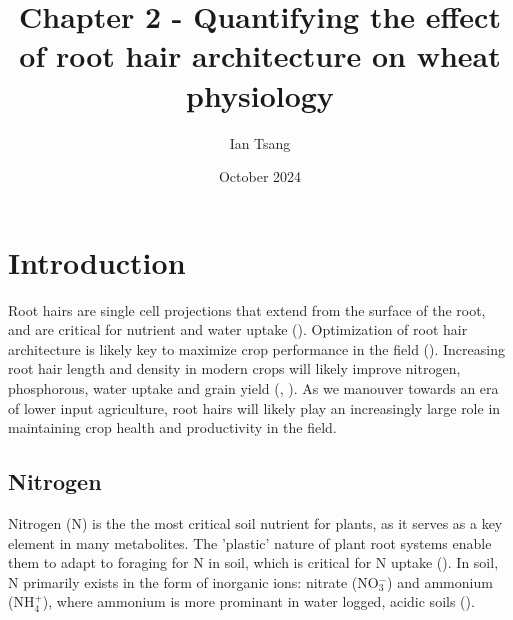 \documentclass{article}
\title{Chapter 2 - Quantifying the effect of root hair architecture on wheat
physiology}
\author{Ian Tsang}
\date{October 2024}
\begin{document}
\maketitle
\onehalfspacing \sloppy
\section{Introduction}
Root hairs are single cell projections that extend from the surface of the root, and are critical for nutrient and water uptake (\cite{tsang_root_2024}). Optimization of root hair architecture is likely key to maximize crop performance in the field (\cite{tsang_root_2024}). Increasing root hair length and density in modern crops will likely improve nitrogen, phosphorous, water uptake and grain yield (\cite{gahoonia_direct_1998}, \cite{saengwilai_root_2021}). As we manouver towards an era of lower input agriculture, root hairs will likely play an increasingly large role in maintaining crop health and productivity in the field.

\subsection{Nitrogen}
Nitrogen (N) is the the most critical soil nutrient for plants, as it serves
as a key element in many metabolites. The 'plastic' nature of plant root systems
enable them to adapt to foraging for N in soil, which is critical for N
uptake (\cite{bienert_root_2021}). In soil, N primarily exists in the form
of inorganic ions: nitrate (NO$_{3}^{-}$) and ammonium (NH$_{4}^{+}$), where
ammonium is more prominant in water logged, acidic soils (\cite{bienert_root_2021}).
\end{document}
